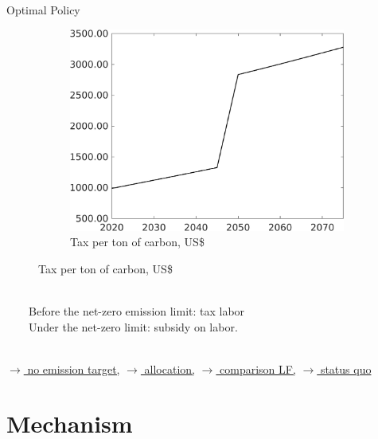 \documentclass[11pt,aspectratio=169]{beamer}
\begin{document}
\begin{frame}{Optimal Policy}
\begin{figure}[h!!]
\begin{subfigure}{0.32\textwidth}
		\end{subfigure}	
		\begin{subfigure}{0.32\textwidth}		
		\caption{Tax per ton of carbon,  US\$}
		\includegraphics[width=1\textwidth]{../codding_model/own_basedOnFried/optimalPol_010922_revision/figures/all_13Sept22_Tplus30/Single_periods12_OPT_T_NoTaus_Tauf_regime4_spillover0_knspil0_noskill0_sep0_xgrowth0_extern0_PV1_sizeequ0_GOV0_etaa0.79.png}
	\end{subfigure}
	\end{figure}
\vspace{5mm}
\begin{block}{}
	\ \\
	\ \ \ \  Before the net-zero emission limit: tax labor  \\ \ \ \ \ Under the net-zero limit: subsidy on labor. \  \ \\ \ 
\end{block}	
\vspace{-2mm}
\hfill
\hyperlink{notopt}{\tiny{$\rightarrow$ no emission target,}} 
\hyperlink{alloc}{\tiny{$\rightarrow$ allocation,}} 
\hyperlink{allocLF}{\tiny{$\rightarrow$ comparison LF,}} 
\hyperlink{sq}{\tiny{$\rightarrow$ status quo}} 
\hypertarget{backmainres}{}
\end{frame}

\hypertarget{benf}{}
\section*{Mechanism}
\end{document}
